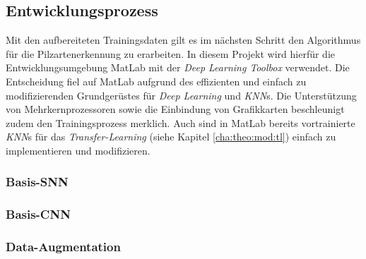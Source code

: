 
\subsection{Entwicklungsprozess}\label{cha:met:dev}
Mit den aufbereiteten Trainingsdaten gilt es im nächsten Schritt den Algorithmus für die Pilzartenerkennung zu erarbeiten. In diesem Projekt wird hierfür die Entwicklungsumgebung MatLab mit der \textit{Deep Learning Toolbox}\cite{matlab} verwendet. Die Entscheidung fiel auf MatLab aufgrund des effizienten und einfach zu modifizierenden Grundgerüstes für \textit{Deep Learning} und \textit{KNN}s. Die Unterstützung von Mehrkernprozessoren sowie die Einbindung von Grafikkarten beschleunigt zudem den Trainingsprozess merklich. Auch sind in MatLab bereits vortrainierte \textit{KNN}s für das \textit{Transfer-Learning} (siehe Kapitel \ref{cha:theo:mod:tl}) einfach zu implementieren und modifizieren.

\subsubsection{Basis-SNN}


\subsubsection{Basis-CNN}

\subsubsection{Data-Augmentation}


